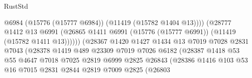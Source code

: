 \begin{lexlean}{RustStd}
\begin{coremodule}
                                              @6984
                                              (@15776 (@15777 @6984))
                                              (@11419 (@15782 @1404 @13))))
                                          (@28777
                                            @1412
                                            @13
                                            @6991
                                            (@26865
                                              @1411
                                              @6991
                                              (@15776 (@15777 @6991))
                                              (@11419 (@15782 @1411 @13))))))
                                      (@28367
                                        @1420
                                        @1427
                                        @1434
                                        @13
                                        @7019
                                        @7028
                                        @2831
                                        @7043
                                        (@28378
                                          @1419
                                          @489
                                          @23309
                                          @7019
                                          @7026
                                          @6182
                                          (@28387
                                            @1418
                                            @53
                                            @55
                                            @4647
                                            @7018
                                            @7025
                                            @2819
                                            @6999
                                            @2825
                                            @26843
                                            (@28386
                                              @1416
                                              @103
                                              @53
                                              @16
                                              @7015
                                              @2831
                                              @2844
                                              @2819
                                              @7009
                                              @2825
                                              (@26803

\end{coremodule}
\end{lexlean}
